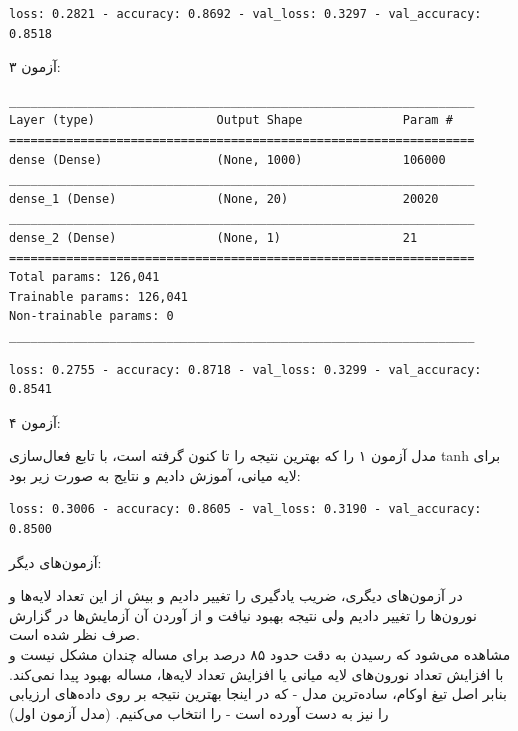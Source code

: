 \documentclass{article}
\begin{document}
\begin{latin}
\begin{lstlisting}
loss: 0.2821 - accuracy: 0.8692 - val_loss: 0.3297 - val_accuracy: 0.8518
\end{lstlisting}
\end{latin}

آزمون ۳:

\begin{latin}
\begin{lstlisting}
_________________________________________________________________
Layer (type)                 Output Shape              Param #   
=================================================================
dense (Dense)                (None, 1000)              106000    
_________________________________________________________________
dense_1 (Dense)              (None, 20)                20020     
_________________________________________________________________
dense_2 (Dense)              (None, 1)                 21        
=================================================================
Total params: 126,041
Trainable params: 126,041
Non-trainable params: 0
_________________________________________________________________
\end{lstlisting}
\end{latin}

\begin{latin}
\begin{lstlisting}
loss: 0.2755 - accuracy: 0.8718 - val_loss: 0.3299 - val_accuracy: 0.8541
\end{lstlisting}
\end{latin}

آزمون ۴:

مدل آزمون ۱ را که بهترین نتیجه را تا کنون گرفته است، با تابع فعال‌سازی tanh برای لایه میانی، آموزش دادیم و نتایج به صورت زیر بود:

\begin{latin}
\begin{lstlisting}
loss: 0.3006 - accuracy: 0.8605 - val_loss: 0.3190 - val_accuracy: 0.8500
\end{lstlisting}
\end{latin}


آزمون‌های دیگر:

در آزمون‌های دیگری، ضریب یادگیری را تغییر دادیم و بیش از این تعداد لایه‌ها و نورون‌ها را تغییر دادیم ولی نتیجه بهبود نیافت و از آوردن آن آزمایش‌ها در گزارش صرف نظر شده است.\\ 

مشاهده می‌شود که رسیدن به دقت حدود ۸۵ درصد برای مساله چندان مشکل نیست و با افزایش تعداد نورون‌های لایه میانی یا افزایش تعداد لایه‌ها، مساله بهبود پیدا نمی‌کند. بنابر اصل تیغ اوکام، ساده‌ترین مدل - که در اینجا بهترین نتیجه بر روی داده‌های ارزیابی را نیز به دست آورده است - را انتخاب می‌کنیم. (مدل آزمون اول)
\end{document}
